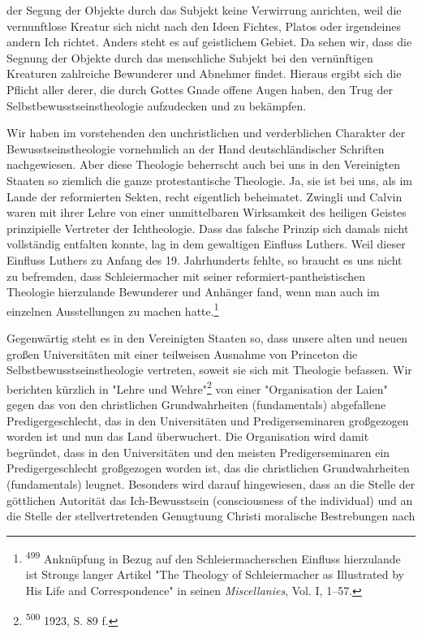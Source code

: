 der Segung der Objekte durch das Subjekt keine Verwirrung anrichten, weil die vernunftlose Kreatur sich nicht nach den Ideen Fichtes, Platos oder irgendeines andern Ich richtet. Anders steht es auf geistlichem Gebiet. Da sehen wir, dass die Segnung der Objekte durch das menschliche Subjekt bei den vernünftigen Kreaturen zahlreiche Bewunderer und Abnehmer findet. Hieraus ergibt sich die Pflicht aller derer, die durch Gottes Gnade offene Augen haben, den Trug der Selbstbewusstseinstheologie aufzudecken und zu bekämpfen.\par Wir haben im vorstehenden den unchristlichen und verderblichen Charakter der Bewusstseinstheologie vornehmlich an der Hand deutschländischer Schriften nachgewiesen. Aber diese Theologie beherrscht auch bei uns in den Vereinigten Staaten so ziemlich die ganze protestantische Theologie. Ja, sie ist bei uns, als im Lande der reformierten Sekten, recht eigentlich beheimatet. Zwingli und Calvin waren mit ihrer Lehre von einer unmittelbaren Wirksamkeit des heiligen Geistes prinzipielle Vertreter der Ichtheologie. Dass das falsche Prinzip sich damals nicht vollständig entfalten konnte, lag in dem gewaltigen Einfluss Luthers. Weil dieser Einfluss Luthers zu Anfang des 19. Jahrhunderts fehlte, so braucht es uns nicht zu befremden, dass Schleiermacher mit seiner reformiert-pantheistischen Theologie hierzulande Bewunderer und Anhänger fand, wenn man auch im einzelnen Ausstellungen zu machen hatte.\footnote{\textsuperscript{499} Anknüpfung in Bezug auf den Schleiermacherschen Einfluss hierzulande ist Strongs langer Artikel "The Theology of Schleiermacher as Illustrated by His Life and Correspondence" in seinen \emph{Miscellanies}, Vol. I, 1--57.}\par Gegenwärtig steht es in den Vereinigten Staaten so, dass unsere alten und neuen großen Universitäten mit einer teilweisen Ausnahme von Princeton die Selbstbewusstseinstheologie vertreten, soweit sie sich mit Theologie befassen. Wir berichten kürzlich in "Lehre und Wehre"\footnote{\textsuperscript{500} 1923, S. 89 f.} von einer "Organisation der Laien" gegen das von den christlichen Grundwahrheiten (fundamentals) abgefallene Predigergeschlecht, das in den Universitäten und Predigerseminaren großgezogen worden ist und nun das Land überwuchert. Die Organisation wird damit begründet, dass in den Universitäten und den meisten Predigerseminaren ein Predigergeschlecht großgezogen worden ist, das die christlichen Grundwahrheiten (fundamentals) leugnet. Besonders wird darauf hingewiesen, dass an die Stelle der göttlichen Autorität das Ich-Bewusstsein (consciousness of the individual) und an die Stelle der stellvertretenden Genugtuung Christi moralische Bestrebungen nach